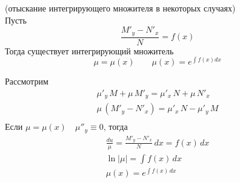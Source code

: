 \begin{Note}(отыскание интегрирующего множителя в некоторых случаях)\\
    Пусть 
    \[
        \frac{M'_y-N'_x}{N}=f(x)
    \]
    Тогда существует интегрирующий множитель
    \[
        \mu=\mu(x) \qquad \mu(x)=e^{\int f(x)dx}
    \]
\end{Note}  

\begin{Proof}
    Рассмотрим
    \begin{gather*}
        \mu'_y\,M+\mu\,M'_y=\mu'_x\,N+\mu\,N'_x\\
        \mu\,(M'_y-N'_x)=\mu'_x\,N-\mu'_y\,M\\
    \end{gather*}
    Если $\mu = \mu(x) \quad \mu''_y \equiv 0$, тогда
    \begin{gather*}
        \frac{du}{\mu}=\frac{M'_y-N'_x}{N}\,dx=f(x)\,dx\\
        \ln|\mu|=\int f(x)\,dx\\
        \mu(x)=e^{\int f(x)\,dx}\\
    \end{gather*}
\end{Proof}

